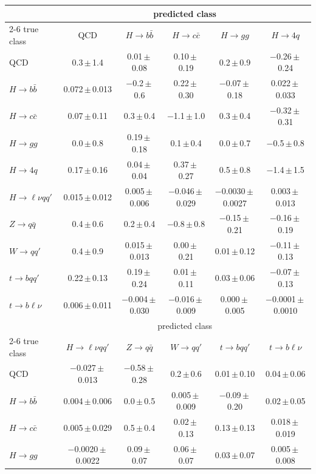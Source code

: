 \begin{landscape}
{\begin{center}
\begin{minipage}{\linewidth}
\begin{tabular*}{\linewidth}{@{\extracolsep{\fill}}lccccc@{}}
\midrule
 & \multicolumn{5}{c}{predicted class} \\
\cmidrule(lr){2-6}
true class & QCD & $H\to b\bar b$ & $H\to c\bar c$ & $H\to gg$ & $H\to 4q$ \\
\midrule
QCD & 0.3\,$\pm$\,1.4 & 0.01\,$\pm$\,0.08 & 0.10\,$\pm$\,0.19 & 0.2\,$\pm$\,0.9 & $-$0.26\,$\pm$\,0.24 \\
$H\to b\bar b$ & 0.072\,$\pm$\,0.013 & $-$0.2\,$\pm$\,0.6 & 0.22\,$\pm$\,0.30 & $-$0.07\,$\pm$\,0.18 & 0.022\,$\pm$\,0.033 \\
$H\to c\bar c$ & 0.07\,$\pm$\,0.11 & 0.3\,$\pm$\,0.4 & $-$1.1\,$\pm$\,1.0 & 0.3\,$\pm$\,0.4 & $-$0.32\,$\pm$\,0.31 \\
$H\to gg$ & 0.0\,$\pm$\,0.8 & 0.19\,$\pm$\,0.18 & 0.1\,$\pm$\,0.4 & 0.0\,$\pm$\,0.7 & $-$0.5\,$\pm$\,0.8 \\
$H\to 4q$ & 0.17\,$\pm$\,0.16 & 0.04\,$\pm$\,0.04 & 0.37\,$\pm$\,0.27 & 0.5\,$\pm$\,0.8 & $-$1.4\,$\pm$\,1.5 \\
$H\to \ell\nu qq'$ & 0.015\,$\pm$\,0.012 & 0.005\,$\pm$\,0.006 & $-$0.046\,$\pm$\,0.029 & $-$0.0030\,$\pm$\,0.0027 & 0.003\,$\pm$\,0.013 \\
$Z\to q\bar q$ & 0.4\,$\pm$\,0.6 & 0.2\,$\pm$\,0.4 & $-$0.8\,$\pm$\,0.8 & $-$0.15\,$\pm$\,0.21 & $-$0.16\,$\pm$\,0.19 \\
$W\to qq'$ & 0.4\,$\pm$\,0.9 & 0.015\,$\pm$\,0.013 & 0.00\,$\pm$\,0.21 & 0.01\,$\pm$\,0.12 & $-$0.11\,$\pm$\,0.13 \\
$t\to bqq'$ & 0.22\,$\pm$\,0.13 & 0.19\,$\pm$\,0.24 & 0.01\,$\pm$\,0.11 & 0.03\,$\pm$\,0.06 & $-$0.07\,$\pm$\,0.13 \\
$t\to b\ell\nu$ & 0.006\,$\pm$\,0.011 & $-$0.004\,$\pm$\,0.030 & $-$0.016\,$\pm$\,0.009 & 0.000\,$\pm$\,0.005 & $-$0.0001\,$\pm$\,0.0010 \\
\midrule
 & \multicolumn{5}{c}{predicted class} \\
\cmidrule(lr){2-6}
true class & $H\to \ell\nu qq'$ & $Z\to q\bar q$ & $W\to qq'$ & $t\to bqq'$ & $t\to b\ell\nu$ \\
\midrule
QCD & $-$0.027\,$\pm$\,0.013 & $-$0.58\,$\pm$\,0.28 & 0.2\,$\pm$\,0.6 & 0.01\,$\pm$\,0.10 & 0.04\,$\pm$\,0.06 \\
$H\to b\bar b$ & 0.004\,$\pm$\,0.006 & 0.0\,$\pm$\,0.5 & 0.005\,$\pm$\,0.009 & $-$0.09\,$\pm$\,0.20 & 0.02\,$\pm$\,0.05 \\
$H\to c\bar c$ & 0.005\,$\pm$\,0.029 & 0.5\,$\pm$\,0.4 & 0.02\,$\pm$\,0.13 & 0.13\,$\pm$\,0.13 & 0.018\,$\pm$\,0.019 \\
$H\to gg$ & $-$0.0020\,$\pm$\,0.0022 & 0.09\,$\pm$\,0.07 & 0.06\,$\pm$\,0.07 & 0.03\,$\pm$\,0.07 & 0.005\,$\pm$\,0.008 \\

\end{tabular*}
\end{minipage}
\end{center}}
\end{landscape}
